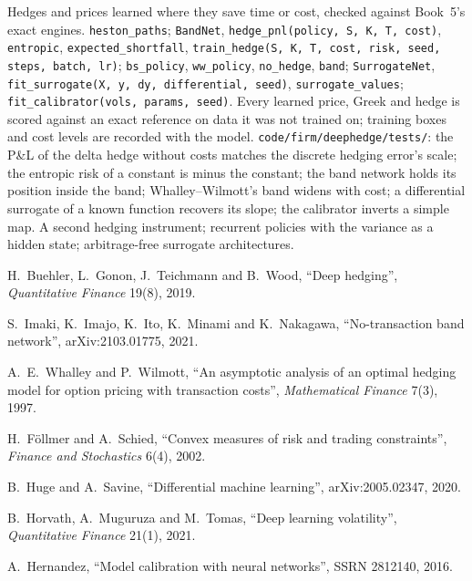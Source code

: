 \begin{build}
 Hedges and prices learned where they save time or cost, checked against Book~5's exact engines.
 \texttt{heston\_paths}; \texttt{BandNet}, \texttt{hedge\_pnl(policy, S, K, T, cost)}, \texttt{entropic},
\texttt{expected\_shortfall}, \texttt{train\_hedge(S, K, T, cost, risk, seed, steps, batch, lr)}; \texttt{bs\_policy},
\texttt{ww\_policy}, \texttt{no\_hedge}, \texttt{band}; \texttt{SurrogateNet}, \texttt{fit\_surrogate(X, y, dy,
differential, seed)}, \texttt{surrogate\_values}; \texttt{fit\_calibrator(vols, params, seed)}.
 Every learned price, Greek and hedge is scored against an exact reference on data it was not trained on;
training boxes and cost levels are recorded with the model.
 \texttt{code/firm/deephedge/tests/}: the P\&L of the delta hedge without costs matches the discrete
hedging error's scale; the entropic risk of a constant is minus the constant; the band network holds its position inside the
band; Whalley--Wilmott's band widens with cost; a differential surrogate of a known function recovers its slope; the
calibrator inverts a simple map.
 A second hedging instrument; recurrent policies with the variance as a hidden state; arbitrage-free surrogate
architectures.
\end{build}

\begin{omsources}
\item H.~Buehler, L.~Gonon, J.~Teichmann and B.~Wood, ``Deep hedging'', \emph{Quantitative Finance} 19(8), 2019.
\item S.~Imaki, K.~Imajo, K.~Ito, K.~Minami and K.~Nakagawa, ``No-transaction band network'', arXiv:2103.01775, 2021.
\item A.~E.~Whalley and P.~Wilmott, ``An asymptotic analysis of an optimal hedging model for option pricing with transaction
costs'', \emph{Mathematical Finance} 7(3), 1997.
\item H.~Föllmer and A.~Schied, ``Convex measures of risk and trading constraints'', \emph{Finance and Stochastics} 6(4), 2002.
\item B.~Huge and A.~Savine, ``Differential machine learning'', arXiv:2005.02347, 2020.
\item B.~Horvath, A.~Muguruza and M.~Tomas, ``Deep learning volatility'', \emph{Quantitative Finance} 21(1), 2021.
\item A.~Hernandez, ``Model calibration with neural networks'', SSRN 2812140, 2016.
\end{omsources}

